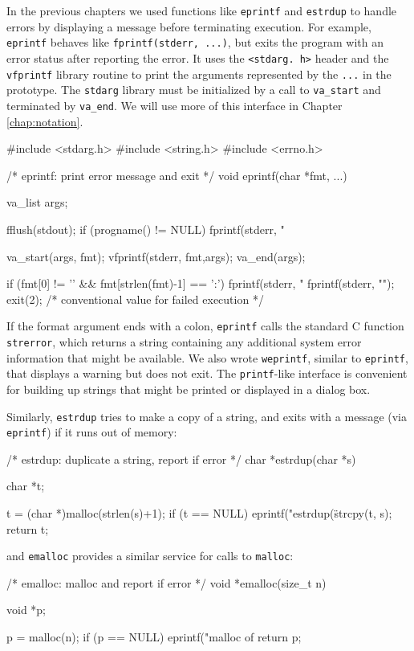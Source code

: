 In the previous chapters we used functions like \verb'eprintf' and
\verb'estrdup' to handle errors by displaying a message before terminating
execution. For example, \verb'eprintf' behaves like
\verb'fprintf(stderr, ...)', but exits the program with an error status
after reporting the
error. It uses the \verb'<stdarg. h>' header and the \verb'vfprintf'
library routine to print the arguments represented by the \verb'...' in the
prototype. The \verb'stdarg' library must be initialized by a call to
\verb'va_start' and terminated by \verb'va_end'.  We will use more of this
interface in Chapter \ref{chap:notation}.
\begin{wellcode}
    #include <stdarg.h>
    #include <string.h>
    #include <errno.h>

    /* eprintf: print error message and exit */
    void eprintf(char *fmt, ...)
    {
        va_list args;

        fflush(stdout);
        if (progname() != NULL)
            fprintf(stderr, "%

        va_start(args, fmt);
        vfprintf(stderr, fmt,args);
        va_end(args);

        if (fmt[0] != '\0' && fmt[strlen(fmt)-1] == ':')
            fprintf(stderr, " %
        fprintf(stderr, "\n");
        exit(2);    /* conventional value for failed execution */
    }
\end{wellcode}
If the format argument ends with a colon, \verb'eprintf' calls the standard
C function \verb'strerror', which returns a string containing any
additional system error information that might be available. We also wrote
\verb'weprintf', similar to \verb'eprintf', that displays a warning but
does not exit. The \verb'printf'-like interface is convenient for building
up strings that might be printed or displayed in a dialog box.

Similarly, \verb'estrdup' tries to make a copy of a string, and exits with
a message (via \verb'eprintf') if it runs out of memory:
\begin{wellcode}
    /* estrdup: duplicate a string, report if error */
    char *estrdup(char *s)
    {
        char    *t;

        t = (char *)malloc(strlen(s)+1);
        if (t == NULL)
            eprintf("estrdup(\"%
        strcpy(t, s);
        return t;
    }
\end{wellcode}
and \verb'emalloc' provides a similar service for calls to \verb'malloc':
\begin{wellcode}
    /* emalloc: malloc and report if error */
    void *emalloc(size_t n)
    {
        void *p;

        p = malloc(n);
        if (p == NULL)
            eprintf("malloc of %
        return p;
    }
\end{wellcode}

